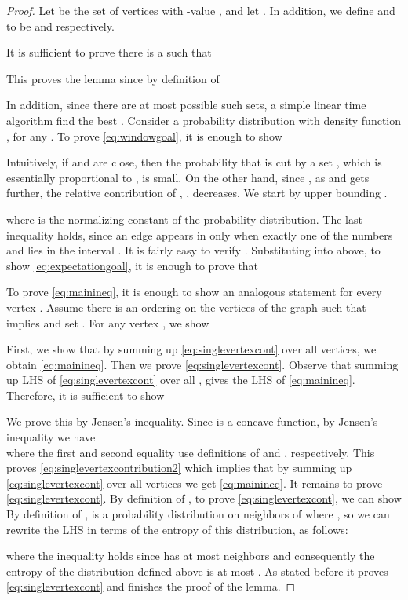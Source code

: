 \documentclass[11pt]{article}
\begin{document}
\begin{proof}Let  be the set of vertices with -value , and let  . 
In addition, we define  and  to be  and  respectively. 



It is sufficient to prove there is a  such that 

 This proves the lemma since by definition of  

In addition, since there are at most  possible such sets, a simple linear time algorithm find the best . Consider a  probability distribution with density function , for any . To prove \eqref{eq:windowgoal}, it is enough to show  
  
Intuitively, if  and  are close, then the  probability that 
 is cut by a set , which is essentially proportional 
to , is small. On the other hand, since 
,  as  and  gets further, the 
relative contribution of , , 
decreases. 
We start by upper bounding .

where  is the normalizing 
constant of the probability distribution. The last inequality holds, 
since an edge  appears in  
only when exactly one of  the numbers  and  lies 
in the interval .
It is fairly easy to verify  . Substituting  
into above, to show \eqref{eq:expectationgoal}, it is enough to prove 
that 


To prove \eqref{eq:mainineq}, it is enough to show an analogous 
statement for  every vertex . Assume there is an ordering on the vertices of the graph such that  implies  and set . For any vertex , we show  

First, we show that by summing up \eqref{eq:singlevertexcont} over all vertices, we obtain \eqref{eq:mainineq}. Then we prove \eqref{eq:singlevertexcont}. Observe that summing up LHS of \eqref{eq:singlevertexcont} over all , gives the LHS of \eqref{eq:mainineq}. Therefore, it is sufficient to show 

We prove this by Jensen's inequality.
Since  is a concave function, by Jensen's inequality we have  \\

where the first and second equality use definitions of  and , respectively. This proves \eqref{eq:singlevertexcontribution2} which implies that by summing up \eqref{eq:singlevertexcont} over all vertices we get \eqref{eq:mainineq}. It remains to prove \eqref{eq:singlevertexcont}. By definition of , to prove  \eqref{eq:singlevertexcont}, we can show \\

By definition of , is a probability distribution on neighbors  of  where , so we can rewrite the LHS in terms of the entropy of this distribution, as follows: 

where the inequality holds since  has at most  neighbors and consequently  the entropy of the distribution defined above is at most .  
As stated before it  proves \eqref{eq:singlevertexcont} and 
finishes the proof of the lemma.
\end{proof}
\end{document}
